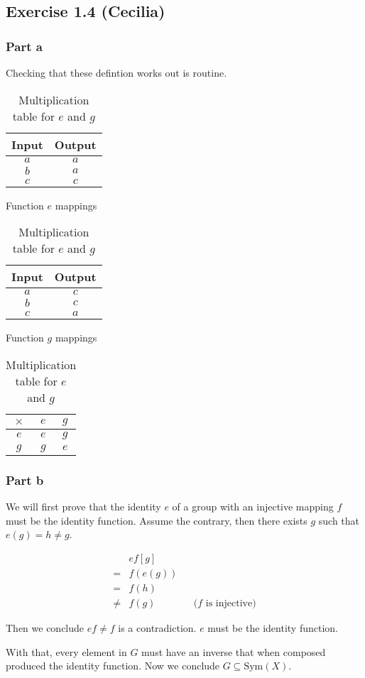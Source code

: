 \subsection*{Exercise 1.4 (Cecilia)}

\subsubsection*{Part a}
Checking that these defintion works out is routine.

\begin{table}[h]
\centering
\begin{minipage}{0.3\linewidth}
\centering
\begin{tabular}{c|c}
\textbf{Input} & \textbf{Output} \\ \hline
$a$ & $a$ \\
$b$ & $a$ \\
$c$ & $c$
\end{tabular}
\caption{Function \(e\) mappings}
\end{minipage}
\hfill
\begin{minipage}{0.3\linewidth}
\centering
\begin{tabular}{c|c}
\textbf{Input} & \textbf{Output} \\ \hline
$a$ & $c$ \\
$b$ & $c$ \\
$c$ & $a$
\end{tabular}
\caption{Function \(g\) mappings}
\end{minipage}
\hfill
\begin{minipage}{0.3\linewidth}
\centering
\begin{tabular}{c|cc}
$\times$ & $e$ & $g$ \\ \hline
$e$ & $e$ & $g$ \\
$g$ & $g$ & $e$ \\
\end{tabular}
\caption{Multiplication table for $e$ and $g$}
\end{minipage}
\end{table}

\subsubsection*{Part b}

We will first prove that the identity $e$ of a group with an injective mapping $f$ must be the identity function. Assume the contrary, then there exists $g$ such that $ e(g) = h \ne g$.

\begin{align*}
     & ef [g]  \\
    =& f(e(g)) \\
    =& f(h)    \\
  \ne& f(g)    && \text{(} f \text{ is injective)}
\end{align*}

Then we conclude $ef \ne f$ is a contradiction. $e$ must be the identity function.

With that, every element in $G$ must have an inverse that when composed produced the identity function. Now we conclude $ G \subseteq \text{Sym}(X) $.
